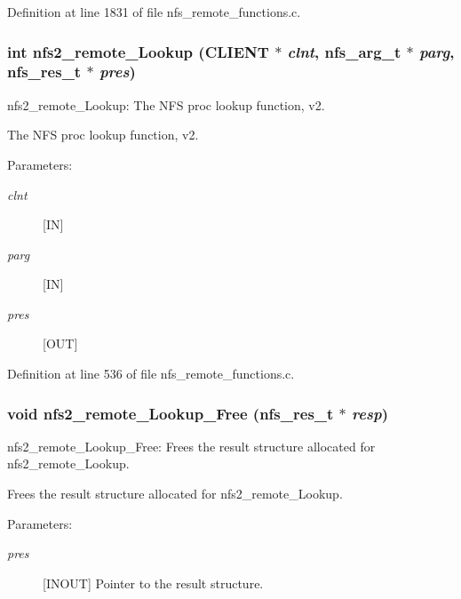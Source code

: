 Definition at line 1831 of file nfs\_\-remote\_\-functions.c.
\subsubsection[{nfs2\_\-remote\_\-Lookup}]{\setlength{\rightskip}{0pt plus 5cm}int nfs2\_\-remote\_\-Lookup (CLIENT $\ast$ {\em clnt}, \/  nfs\_\-arg\_\-t $\ast$ {\em parg}, \/  nfs\_\-res\_\-t $\ast$ {\em pres})}\label{group__NFSprocs_gb69abd3b6ba8d45a90feaeb7c5792381}


nfs2\_\-remote\_\-Lookup: The NFS proc lookup function, v2.

The NFS proc lookup function, v2.

\begin{Desc}
\item[Parameters:]
\begin{description}
\item[{\em clnt}][IN] \item[{\em parg}][IN] \item[{\em pres}][OUT] \end{description}
\end{Desc}


Definition at line 536 of file nfs\_\-remote\_\-functions.c.
\subsubsection[{nfs2\_\-remote\_\-Lookup\_\-Free}]{\setlength{\rightskip}{0pt plus 5cm}void nfs2\_\-remote\_\-Lookup\_\-Free (nfs\_\-res\_\-t $\ast$ {\em resp})}\label{group__NFSprocs_g5c00238539fa4623b77297d794037292}


nfs2\_\-remote\_\-Lookup\_\-Free: Frees the result structure allocated for nfs2\_\-remote\_\-Lookup.

Frees the result structure allocated for nfs2\_\-remote\_\-Lookup.

\begin{Desc}
\item[Parameters:]
\begin{description}
\item[{\em pres}][INOUT] Pointer to the result structure. \end{description}
\end{Desc}


